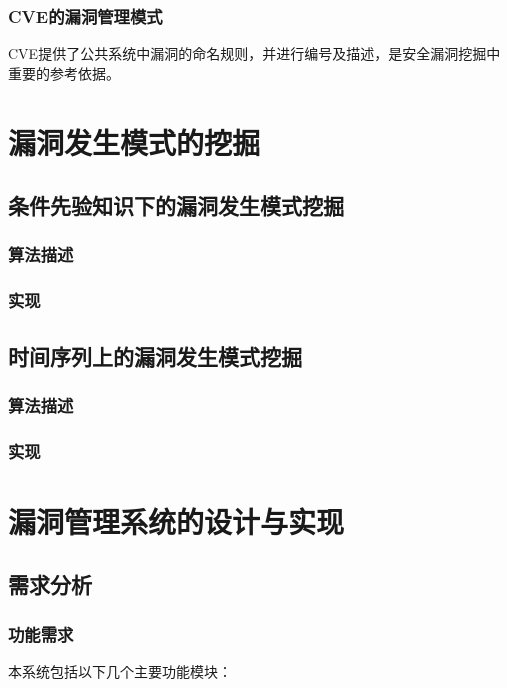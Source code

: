 \documentclass[a4paper]{ctexrep}
\begin{document}
			\subsection{CVE的漏洞管理模式}
			CVE提供了公共系统中漏洞的命名规则，并进行编号及描述，是安全漏洞挖掘中重要的参考依据。

	\chapter{漏洞发生模式的挖掘}
		\section{条件先验知识下的漏洞发生模式挖掘}
			\subsection{算法描述}
			\subsection{实现}
		\section{时间序列上的漏洞发生模式挖掘}
			\subsection{算法描述}
			\subsection{实现}
	\chapter{漏洞管理系统的设计与实现}
		\section{需求分析}
			\subsection{功能需求}
			本系统包括以下几个主要功能模块：
\end{document}
